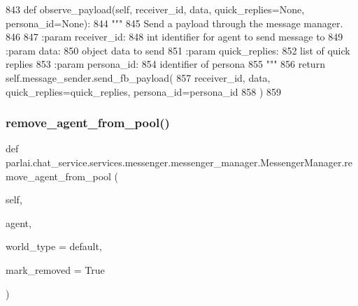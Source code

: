 \begin{DoxyCode}
843     \textcolor{keyword}{def }observe\_payload(self, receiver\_id, data, quick\_replies=None, persona\_id=None):
844         \textcolor{stringliteral}{"""}
845 \textcolor{stringliteral}{        Send a payload through the message manager.}
846 \textcolor{stringliteral}{}
847 \textcolor{stringliteral}{        :param receiver\_id:}
848 \textcolor{stringliteral}{            int identifier for agent to send message to}
849 \textcolor{stringliteral}{        :param data:}
850 \textcolor{stringliteral}{            object data to send}
851 \textcolor{stringliteral}{        :param quick\_replies:}
852 \textcolor{stringliteral}{            list of quick replies}
853 \textcolor{stringliteral}{        :param persona\_id:}
854 \textcolor{stringliteral}{            identifier of persona}
855 \textcolor{stringliteral}{        """}
856         \textcolor{keywordflow}{return} self.message\_sender.send\_fb\_payload(
857             receiver\_id, data, quick\_replies=quick\_replies, persona\_id=persona\_id
858         )
859 
\end{DoxyCode}
\mbox{\label{classparlai_1_1chat__service_1_1services_1_1messenger_1_1messenger__manager_1_1MessengerManager_ad896b8db2d47d53b82ab052613e58845}} 
\subsubsection{\texorpdfstring{remove\+\_\+agent\+\_\+from\+\_\+pool()}{remove\_agent\_from\_pool()}}
{\footnotesize\ttfamily def parlai.\+chat\+\_\+service.\+services.\+messenger.\+messenger\+\_\+manager.\+Messenger\+Manager.\+remove\+\_\+agent\+\_\+from\+\_\+pool (\begin{DoxyParamCaption}\item[{}]{self,  }\item[{}]{agent,  }\item[{}]{world\+\_\+type = {\ttfamily \textquotesingle{}default\textquotesingle{}},  }\item[{}]{mark\+\_\+removed = {\ttfamily True} }\end{DoxyParamCaption})}

